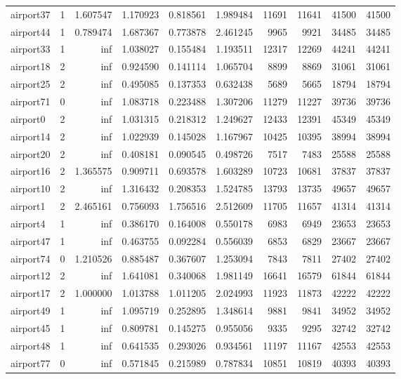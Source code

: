\begin{longtable}{|l|r|r|r|r|r|r|r|r|r|}
airport37 & 1 & 1.607547 & 1.170923 & 0.818561 & 1.989484 & 11691 & 11641 & 41500 & 41500 \\
airport44 & 1 & 0.789474 & 1.687367 & 0.773878 & 2.461245 & 9965 & 9921 & 34485 & 34485 \\
airport33 & 1 & inf & 1.038027 & 0.155484 & 1.193511 & 12317 & 12269 & 44241 & 44241 \\
airport18 & 2 & inf & 0.924590 & 0.141114 & 1.065704 & 8899 & 8869 & 31061 & 31061 \\
airport25 & 2 & inf & 0.495085 & 0.137353 & 0.632438 & 5689 & 5665 & 18794 & 18794 \\
airport71 & 0 & inf & 1.083718 & 0.223488 & 1.307206 & 11279 & 11227 & 39736 & 39736 \\
airport0 & 2 & inf & 1.031315 & 0.218312 & 1.249627 & 12433 & 12391 & 45349 & 45349 \\
airport14 & 2 & inf & 1.022939 & 0.145028 & 1.167967 & 10425 & 10395 & 38994 & 38994 \\
airport20 & 2 & inf & 0.408181 & 0.090545 & 0.498726 & 7517 & 7483 & 25588 & 25588 \\
airport16 & 2 & 1.365575 & 0.909711 & 0.693578 & 1.603289 & 10723 & 10681 & 37837 & 37837 \\
airport10 & 2 & inf & 1.316432 & 0.208353 & 1.524785 & 13793 & 13735 & 49657 & 49657 \\
airport1 & 2 & 2.465161 & 0.756093 & 1.756516 & 2.512609 & 11705 & 11657 & 41314 & 41314 \\
airport4 & 1 & inf & 0.386170 & 0.164008 & 0.550178 & 6983 & 6949 & 23653 & 23653 \\
airport47 & 1 & inf & 0.463755 & 0.092284 & 0.556039 & 6853 & 6829 & 23667 & 23667 \\
airport74 & 0 & 1.210526 & 0.885487 & 0.367607 & 1.253094 & 7843 & 7811 & 27402 & 27402 \\
airport12 & 2 & inf & 1.641081 & 0.340068 & 1.981149 & 16641 & 16579 & 61844 & 61844 \\
airport17 & 2 & 1.000000 & 1.013788 & 1.011205 & 2.024993 & 11923 & 11873 & 42222 & 42222 \\
airport49 & 1 & inf & 1.095719 & 0.252895 & 1.348614 & 9881 & 9841 & 34952 & 34952 \\
airport45 & 1 & inf & 0.809781 & 0.145275 & 0.955056 & 9335 & 9295 & 32742 & 32742 \\
airport48 & 1 & inf & 0.641535 & 0.293026 & 0.934561 & 11197 & 11167 & 42553 & 42553 \\
airport77 & 0 & inf & 0.571845 & 0.215989 & 0.787834 & 10851 & 10819 & 40393 & 40393 \\

\end{longtable}
